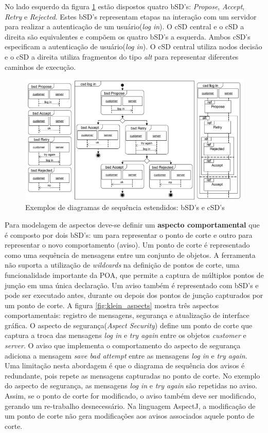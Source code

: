 No lado esquerdo da figura \ref{fig:klein_sequence_diagrams} estão dispostos quatro bSD's: \textit{Propose}, \textit{Accept}, \textit{Retry} e
\textit{Rejected}. Estes bSD's representam etapas na interação com um servidor para realizar a autenticação de um usuário(\textit{log in}). O cSD
central e o cSD a direita são equivalentes e compõem os quatro bSD's a esquerda. Ambos cSD's especificam a autenticação de usuário(\textit{log in}). O
cSD central utiliza nodos decisão e o cSD a direita utiliza fragmentos do tipo \textit{alt} para representar diferentes caminhos de execução.

\begin{figure}
	\centering
	\includegraphics[width=475px]{img/klein_sequence_diagrams.png}
	\caption{Exemplos de diagramas de sequência
	estendidos: bSD's e cSD's}\label{fig:klein_sequence_diagrams}
\end{figure}

Para modelagem de aspectos deve-se definir um \textbf{aspecto comportamental} que é composto por dois bSD's: um para representar o ponto de corte e
outro para representar o novo comportamento (aviso). Um ponto de corte é representado como uma sequência de mensagens entre um conjunto de objetos. A
ferramenta não suporta a utilização de \textit{wildcards} na definição de pontos de corte, uma funcionalidade importante da POA, que permite a captura
de múltiplos pontos de junção em uma única declaração. Um aviso também é representado com bSD's e pode ser executado antes, durante ou depois dos
pontos de junção capturados por um ponto de corte. A figura \ref{fig:klein_aspects} mostra três aspectos comportamentais: registro de mensagens,
segurança e atualização de interface gráfica. O aspecto de segurança(\textit{Aspect Security}) define um ponto de corte que captura a troca das
mensagens \textit{log in} e \textit{try again} entre os objetos \textit{customer} e \textit{server}. O aviso que implementa o comportamento do aspecto
de segurança adiciona a mensagem \textit{save bad attempt} entre as mensagens \textit{log in} e \textit{try again}. Uma limitação nesta abordagem é
que o diagrama de sequência dos avisos é redundante, pois repete as mensagens capturadas no ponto de corte. No exemplo do aspecto de segurança, as
mensagens \textit{log in} e \textit{try again} são repetidas no aviso. Assim, se o ponto de corte for modificado, o aviso também deve ser modificado,
gerando um re-trabalho desnecessário. Na linguagem AspectJ, a modificação de um ponto de corte não gera modificações aos avisos associados aquele
ponto de corte.

